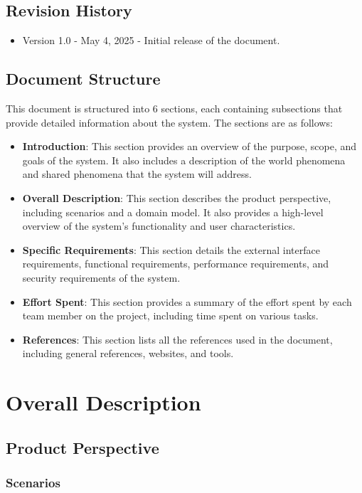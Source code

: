 \documentclass{article}
\begin{document}
\subsection{Revision History}
\begin{itemize}
    \item Version 1.0 - May 4, 2025 - Initial release of the document.
\end{itemize}


\subsection{Document Structure}

This document is structured into 6 sections, each containing subsections that provide detailed information about the system. The sections are as follows:
\begin{itemize}
    \item \textbf{Introduction}: This section provides an overview of the purpose, scope, and goals of the system. It also includes a description of the world phenomena and shared phenomena that the system will address.
    \item \textbf{Overall Description}: This section describes the product perspective, including scenarios and a domain model. It also provides a high-level overview of the system's functionality and user characteristics.   
    \item \textbf{Specific Requirements}: This section details the external interface requirements, functional requirements, performance requirements, and security requirements of the system.
    \item \textbf{Effort Spent}: This section provides a summary of the effort spent by each team member on the project, including time spent on various tasks.
    \item \textbf{References}: This section lists all the references used in the document, including general references, websites, and tools.
\end{itemize}  



\clearpage
\section{Overall Description}
\subsection{Product Perspective}
\subsubsection{Scenarios}
\end{document}
